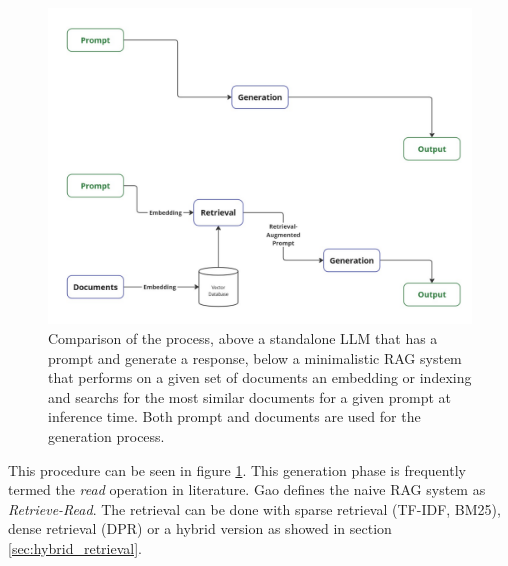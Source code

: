 \begin{figure}[h!]
    \centering
    \includegraphics[width=\textwidth]{images/LLM-vs-RAG.pdf}
    \caption{Comparison of the process, above a standalone LLM that has a prompt and generate a response, below a minimalistic RAG system that performs on a given set of documents an embedding or indexing and searchs for the most similar documents for a given prompt at inference time. Both prompt and documents are used for the generation process.}
    \label{fig:naive_rag}
\end{figure}

This procedure can be seen in figure \ref{fig:naive_rag}. This generation phase is frequently termed the \textit{read} operation in literature. Gao \cite{Gao.18.12.2023} defines the naive RAG system as \textit{Retrieve-Read}. The retrieval can be done with sparse retrieval (TF-IDF, BM25), dense retrieval (DPR) or a hybrid version as showed in section \ref{sec:hybrid_retrieval}. 

